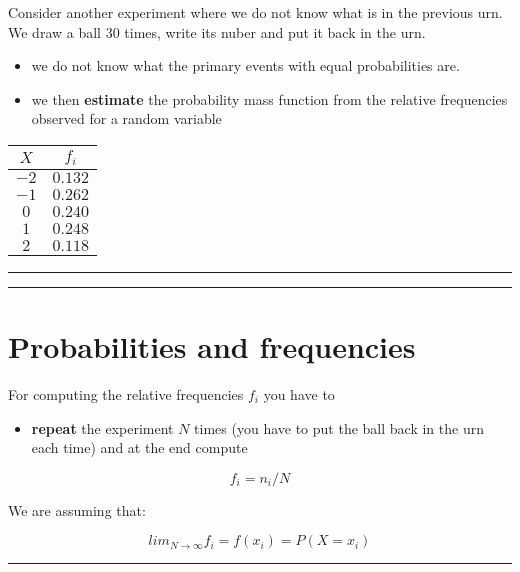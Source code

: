 \documentclass[
]{book}
\providecommand{\tightlist}{%
  \setlength{\itemsep}{0pt}\setlength{\parskip}{0pt}}
\begin{document}
Consider another experiment where we do not know what is in the previous urn. We draw a ball \(30\) times, write its nuber and put it back in the urn.

\begin{itemize}
\item
  we do not know what the primary events with equal probabilities are.
\item
  we then \textbf{estimate} the probability mass function from the relative frequencies observed for a random variable
\end{itemize}

\begin{longtable}[]{@{}cc@{}}
\toprule
\(X\) & \(f_i\) \\
\midrule
\endhead
\(-2\) & \(0.132\) \\
\(-1\) & \(0.262\) \\
\(0\) & \(0.240\) \\
\(1\) & \(0.248\) \\
\(2\) & \(0.118\) \\
\bottomrule
\end{longtable}

\begin{center}\rule{0.5\linewidth}{0.5pt}\end{center}

\begin{center}\rule{0.5\linewidth}{0.5pt}\end{center}

\hypertarget{probabilities-and-frequencies}{%
\section{Probabilities and frequencies}\label{probabilities-and-frequencies}}

For computing the relative frequencies \(f_i\) you have to

\begin{itemize}
\tightlist
\item
  \textbf{repeat} the experiment \(N\) times (you have to put the ball back in the urn each time) and at the end compute
\end{itemize}

\[f_i=n_i/N\]

We are assuming that:

\[lim_{N \rightarrow \infty} f_i = f(x_i)=P(X=x_i)\]

\begin{center}\rule{0.5\linewidth}{0.5pt}\end{center}
\end{document}
